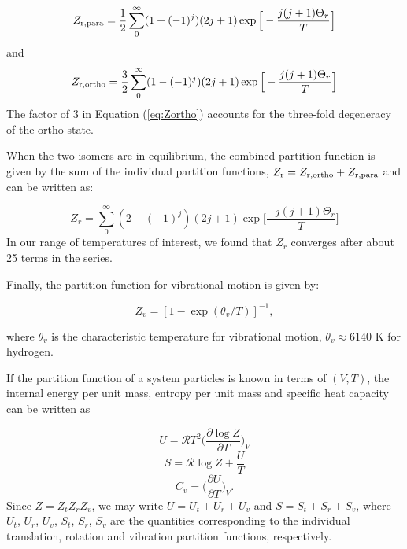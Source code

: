 \documentclass[apj]{emulateapj}
\begin{document}
\begin{equation}
\label{eq:Zpara}
Z_{\rm{r,para}}=\frac{1}{2}\sum_0^\infty (1+(-1)^j) (2 j +1) \exp\Big[-\frac{j(j+1)\Theta_r}{T}\Big]
\end{equation}
and
\begin{equation}
\label{eq:Zortho}
Z_{\rm{r,ortho}}=\frac{3}{2}\sum_0^\infty (1-(-1)^j) (2 j +1) \exp\Big[-\frac{j(j+1)\Theta_r}{T}\Big]
\end{equation}
The factor of 3 in Equation (\ref{eq:Zortho}) accounts for the three-fold degeneracy of the ortho state.

 When the two isomers are in equilibrium, the combined partition function is given by the sum of the individual partition functions, $Z_{\rm r}=Z_{\rm{r, ortho}}+Z_{\rm{r,para}}$ and can be written as:

\begin{equation}
\label{eq:Zrspin}
Z_r=\sum_0^\infty (2-(-1)^j) (2j+1) \exp{\Big[\frac{-j (j+1) \Theta_r}{T}\Big]}
\end{equation}
In our range of temperatures of interest, we found that $Z_r$ converges after about 25 terms in the series.


Finally, the partition function for vibrational motion is given by:

\begin{equation}
\label{eq:Zv}
Z_v=[1-\exp{(\theta_v/T)}]^{-1},
\end{equation}

\noindent where $\theta_v$ is the characteristic temperature for vibrational motion, $\theta_v \approx 6140$ K for hydrogen. 

If the partition function of a system particles is known in terms of $(V, T)$, the internal energy per unit mass, entropy per unit mass and specific heat capacity can be written as

%
%

\begin{equation}
\label{eq:u}
U=\mathcal{R} T^2 \Big(\frac{\partial \log{Z}}{\partial T}\Big)_{V}
\end{equation}
\begin{equation}
\label{eq:s}
S=\mathcal{R} \log{Z} + \frac{U}{T}
\end{equation}
\begin{equation}
\label{eq:cv}
C_v=\Big(\frac{\partial U}{\partial T}\Big)_{V}.
\end{equation}
Since $Z=Z_t Z_r Z_v$, we may write $U=U_t+U_r+U_v$ and $S=S_t+S_r+S_v$, where $U_t$, $U_r$, $U_v$, $S_t$, $S_r$, $S_v$ are the quantities corresponding to the individual translation, rotation and vibration partition functions, respectively.
\end{document}
